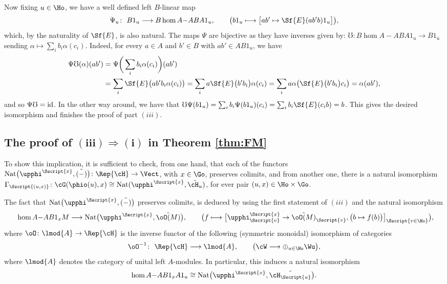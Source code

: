 Now fixing $u \in \Ho$, we have a well defined left $B$-linear map
\begin{gather*}
\Psi_{u}\colon \ B1_{u} \longrightarrow B\hom{A-}{AB}{A1_{u}}, \qquad \big( b1_{u} \longmapsto \big[ ab' \mapsto \Sf{E}(ab'b) 1_{u} \big] \big),
\end{gather*}
which, by the naturality of $\Sf{E}$, is also natural. The maps $\Psi$ are bijective as they have inverses given by: $\mho\colon B\hom{A-}{AB}{A1_{u}} \to B1_{u}$ sending $\alpha \mapsto \sum_{i}b_{i}\alpha(c_{i})$. Indeed, for every $a \in A$ and $b' \in B$ with $ab' \in AB1_{u}$, we have
\begin{align*}
\Psi\mho(\alpha) (ab') &= \Psi\bigg( \sum_{i} b_{i}\alpha(c_{i})\bigg) (ab') \\
&= \sum_{i} \Sf{E}\big( ab'b_{i}\alpha(c_{i})\big) = \sum_{i} a \Sf{E}\big(b'b_{i}\big)\alpha(c_{i}) = \sum_{i} a \alpha\big( \Sf{E}\big( b'b_{i}\big)c_{i}\big) = \alpha(ab'),
\end{align*}
and so $\Psi\mho={\rm id}$. In the other way around, we have that $\mho \Psi(b1_{u}) = \sum_{i}b_{i}\Psi(b1_{u})(c_{i}) = \sum_{i} b_{i}\Sf{E}(c_{i}b) = b$. This gives the desired isomorphism and finishes the proof of part $(iii)$. \QEDA

\subsection[The proof of $(iii) \Rightarrow (i)$ in Theorem \ref{thm:FM}]{The proof of $\boldsymbol{(iii) \Rightarrow (i)}$ in Theorem \ref{thm:FM}}\label{sssec:III-IV}
To show this implication, it is sufficient to check, from one hand, that each of the functors ${\rm Nat}\big(\upphi^{\Sscript{x}}, \tilde{(-)}\big)\colon \Rep{\cH} \to \Vect$, with $x \in \Go$, preserves colimits, and from another one, there is a natural isomorphism $\Gamma_{\Sscript{(u, x)}}\colon \cG(\phio(u), x) \cong {\rm Nat}(\upphi^{\Sscript{x}}, \tilde{\cH_{u}})$, for ever pair $(u, x) \in \Ho \times \Go$.

The fact that ${\rm Nat}\big(\upphi^{\Sscript{x}}, \tilde{(-)}\big)$ preserves colimits, is deduced by using the first statement of $(iii)$ and the natural isomorphism
\begin{gather}\label{Eq:Calentaminetoglobal}
\hom{A-}{AB1_{x}}{M} \longrightarrow {\rm Nat}\big(\upphi^{\Sscript{x}}, \tilde{\oO(M)}\big),\qquad \big( f \longmapsto \big[ \upphi^{\Sscript{x}}_{\Sscript{v}} \to \tilde{\oO(M)}_{\Sscript{v}}, \big( b \mapsto f(b)
\big)\big]_{\Sscript{v \in \Ho}} \big),\!\!\!
\end{gather}
where $\oO\colon \lmod{A} \to \Rep{\cH}$ is the inverse functor of the following (symmetric monoidal) isomorphism of categories
\begin{gather*}
\oO^{-1}\colon \ \Rep{\cH} \longrightarrow \lmod{A}, \qquad \big( \cW \longrightarrow \oplus_{u \in \Ho} \Wu \big),
\end{gather*}
where $\lmod{A}$ denotes the category of unital left $A$-modules. In particular, this induces a natural isomorphism
\begin{gather*}
\hom{A-}{AB1_{x}}{A1_{u}} \cong {\rm Nat}\big(\upphi^{\Sscript{x}}, \tilde{\cH_{\Sscript{u}}}\big).
\end{gather*}

